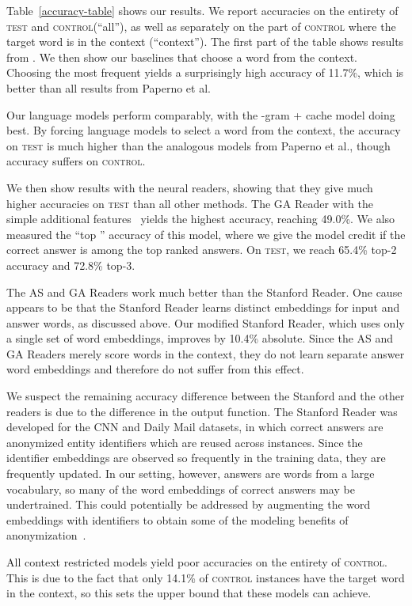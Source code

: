 \documentclass[11pt]{article}
\newcommand{\control}{\textsc{control}\xspace}
\newcommand{\test}{\textsc{test}\xspace}
\begin{document}
Table~\ref{accuracy-table} shows our results. 
We report accuracies on the entirety of \test and \control (``all''), as well as separately on the part of \control where the target word is in the context (``context''). The first part of the table shows results from . 
We then show our baselines that choose a word from the context. 
Choosing the most frequent yields a surprisingly high accuracy of 11.7\%, which is better than all results from Paperno et al. 


Our language models perform comparably, with the -gram + cache model doing best. By forcing language models to select a word from the context, the accuracy on \test is much higher than the analogous models from Paperno et al., though accuracy suffers on \control. 

We then show results with the neural readers, showing that they give much higher accuracies on \test than all other methods. The GA Reader with the simple additional features~\cite{hai-logical:16} yields the highest accuracy, reaching 49.0\%. 
We also measured the ``top '' accuracy of this model, where we give the model credit if the correct answer is among the top  ranked answers. On \test, we reach 65.4\% top-2 accuracy and 72.8\% top-3.

The AS and GA Readers work much better than the Stanford Reader. One cause appears to be that the Stanford Reader learns distinct embeddings for input and answer words, as discussed above. 
Our modified Stanford Reader, which uses only a single set of word embeddings, improves by 10.4\% absolute. 
Since the AS and GA Readers merely score words in the context, they do not learn separate answer word embeddings and therefore do not suffer from this effect. 

We suspect the remaining accuracy difference between the Stanford and the other readers is due to the difference in the output function. The Stanford Reader was developed for the CNN and Daily Mail datasets, in which correct answers are anonymized entity identifiers which are reused across  instances. Since the identifier embeddings are observed so frequently in the training data, they are frequently updated. In our setting, however, answers are words from a large vocabulary, so many of the word embeddings of correct answers may be undertrained. 
This could potentially be addressed by augmenting the word embeddings with identifiers to obtain some of the modeling benefits of anonymization~\cite{hai-logical:16}.

All context restricted models yield poor accuracies on the entirety of \control. This is due to the fact that only 14.1\% of \control instances have the target word in the context, so this sets the upper bound that these models can achieve.
\end{document}
